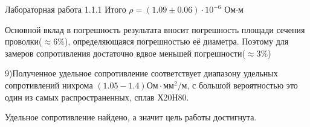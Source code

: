 \documentclass{astroedu-lab}
\begin{document}
\begin{problem}{\large Лабораторная работа 1.1.1}
Итого $\rho = \left( 1.09 \pm 0.06 \right) \cdot 10^{-6}$ Ом$\cdot$м 

Основной вклад в погрешность результата вносит погрешность площади сечения проволки($\approx6\%$), определяющаяся погрешностью её диаметра. Поэтому для замеров сопротивления достаточно вдвое меньшей погрешности($\approx3\%$)

9)Полученное удельное сопротивление соответствует диапазону удельных сопротивлений нихрома $\left(1.05-1.4\right) \text{Ом$\cdot$мм$^2$/м}$, с большой вероятностью это один из самых распространенных, сплав Х20Н80.

Удельное сопротивление найдено, а значит цель работы достигнута.
	

\end{problem}
\end{document}
